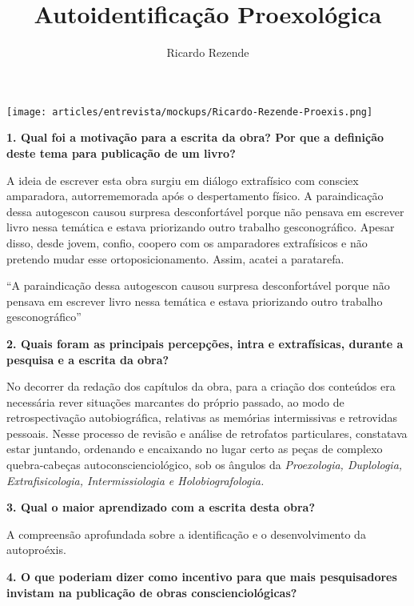 \documentclass{gescons}
\author{Ricardo Rezende}
\title{Autoidentificação Proexológica}
\begin{document}
    \makeentrevistatitle

    \begin{multicols}{2}


\begin{center}
    \texttt{[image: articles/entrevista/mockups/Ricardo-Rezende-Proexis.png]}
\end{center}

\textbf{1. Qual foi a motivação para a escrita da obra? Por que a definição deste tema para publicação de um livro? }

A ideia de escrever esta obra surgiu em diálogo extrafísico com consciex amparadora, autorrememorada após o despertamento físico. A paraindicação dessa autogescon causou surpresa desconfortável porque não pensava em escrever livro nessa temática e estava priorizando outro trabalho gesconográfico. Apesar disso, desde jovem, confio, coopero com os amparadores extrafísicos e não pretendo mudar esse ortoposicionamento. Assim, acatei a paratarefa.

\begin{pullquote}
    ``A paraindicação dessa autogescon causou surpresa desconfortável porque não pensava em escrever livro nessa temática e estava priorizando outro trabalho gesconográfico''
\end{pullquote}

\textbf{2. Quais foram as principais percepções, intra e extrafísicas, durante a pesquisa e a escrita da obra? }

No decorrer da redação dos capítulos da obra, para a criação dos conteúdos era necessária rever situações marcantes do próprio passado, ao modo de retrospectivação autobiográfica, relativas as memórias intermissivas e retrovidas pessoais. Nesse processo de revisão e análise de retrofatos particulares, constatava estar juntando, ordenando e encaixando no lugar certo as peças de complexo quebra-cabeças autoconscienciológico, sob os ângulos da \textit{Proexologia, Duplologia, Extrafisicologia, Intermissiologia e Holobiografologia.}

\textbf{3. Qual o maior aprendizado com a escrita desta obra? }

A compreensão aprofundada sobre a identificação e o desenvolvimento da autoproéxis.

\textbf{4. O que poderiam dizer como incentivo para que mais pesquisadores invistam na publicação de obras conscienciológicas?}


\end{multicols}
\end{document}
